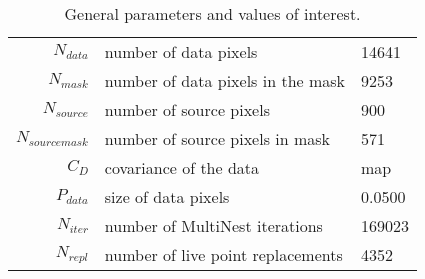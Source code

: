 \begin{table*}[!htb]\caption{General parameters and values of interest.}\begin{center}\begin{tabular}{ r l l }\hline $N_{data}$        & number of data pixels             & 14641 \\ 
 $N_{mask}$        & number of data pixels in the mask & 9253 \\ 
 $N_{source}$      & number of source pixels           & 900 \\ 
 $N_{source mask}$ & number of source pixels in mask   & 571 \\ 
 $C_D$        & covariance of the data            & map \\ 
 $P_{data}$   & size of data pixels               &     0.0500 \\ 
\hline  $N_{iter}$   & number of MultiNest iterations    & 169023 \\ 
 $N_{repl}$   & number of live point replacements & 4352 \\ 
\hline\end{tabular}\end{center}\label{tab:3}\end{table*}
